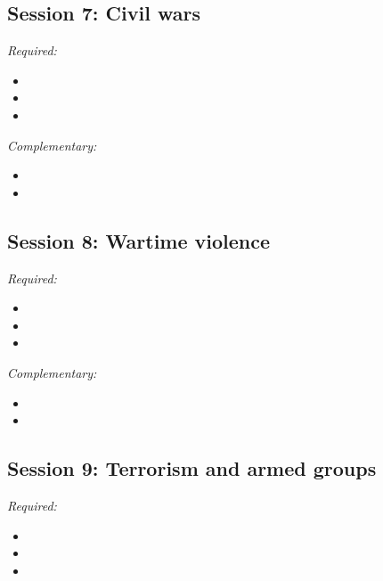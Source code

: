 \documentclass[12pt, a4paper]{article}
\begin{document}
\hline
\subsection*{Session 7: Civil wars}

\noindent\textit{Required:}

\begin{itemize}
  \item
  \item
  \item
\end{itemize}

\noindent\textit{Complementary:}

\begin{itemize}
  \item
  \item
\end{itemize}

\hline
\subsection*{Session 8: Wartime violence}

\noindent\textit{Required:}

\begin{itemize}
  \item
  \item
  \item
\end{itemize}

\noindent\textit{Complementary:}

\begin{itemize}
  \item
  \item
\end{itemize}

\hline
\subsection*{Session 9: Terrorism and armed groups}

\noindent\textit{Required:}

\begin{itemize}
  \item
  \item
  \item
\end{itemize}
\end{document}
